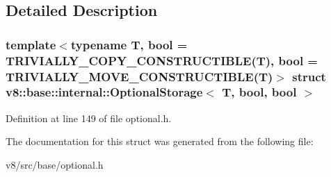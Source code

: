 \subsection{Detailed Description}
\subsubsection*{template$<$typename T, bool = T\+R\+I\+V\+I\+A\+L\+L\+Y\+\_\+\+C\+O\+P\+Y\+\_\+\+C\+O\+N\+S\+T\+R\+U\+C\+T\+I\+B\+L\+E(\+T), bool = T\+R\+I\+V\+I\+A\+L\+L\+Y\+\_\+\+M\+O\+V\+E\+\_\+\+C\+O\+N\+S\+T\+R\+U\+C\+T\+I\+B\+L\+E(\+T)$>$\newline
struct v8\+::base\+::internal\+::\+Optional\+Storage$<$ T, bool, bool $>$}



Definition at line 149 of file optional.\+h.



The documentation for this struct was generated from the following file\+:\begin{DoxyCompactItemize}
\item 
v8/src/base/optional.\+h\end{DoxyCompactItemize}
